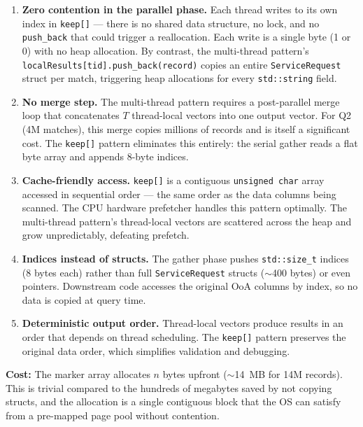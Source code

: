 \documentclass[12pt]{article}
\begin{document}
\begin{enumerate}
  \item \textbf{Zero contention in the parallel phase.}
    Each thread writes to its own index in \texttt{keep[]} --- there is no
    shared data structure, no lock, and no \texttt{push\_back} that could
    trigger a reallocation. Each write is a single byte (1 or 0) with no
    heap allocation. By contrast, the multi-thread pattern's
    \texttt{localResults[tid].push\_back(record)} copies an entire
    \texttt{ServiceRequest} struct per match, triggering heap allocations
    for every \texttt{std::string} field.

  \item \textbf{No merge step.}
    The multi-thread pattern requires a post-parallel merge loop that
    concatenates $T$ thread-local vectors into one output vector. For Q2
    (4M matches), this merge copies millions of records and is itself a
    significant cost. The \texttt{keep[]} pattern eliminates this entirely:
    the serial gather reads a flat byte array and appends 8-byte indices.

  \item \textbf{Cache-friendly access.}
    \texttt{keep[]} is a contiguous \texttt{unsigned char} array accessed in
    sequential order --- the same order as the data columns being scanned.
    The CPU hardware prefetcher handles this pattern optimally. The
    multi-thread pattern's thread-local vectors are scattered across the heap
    and grow unpredictably, defeating prefetch.

  \item \textbf{Indices instead of structs.}
    The gather phase pushes \texttt{std::size\_t} indices (8 bytes each)
    rather than full \texttt{ServiceRequest} structs ($\sim$400 bytes) or
    even pointers. Downstream code accesses the original OoA columns by
    index, so no data is copied at query time.

  \item \textbf{Deterministic output order.}
    Thread-local vectors produce results in an order that depends on thread
    scheduling. The \texttt{keep[]} pattern preserves the original data order,
    which simplifies validation and debugging.
\end{enumerate}

\noindent\textbf{Cost:}
The marker array allocates $n$ bytes upfront ($\sim$14~MB for 14M records).
This is trivial compared to the hundreds of megabytes saved by not copying
structs, and the allocation is a single contiguous block that the OS can
satisfy from a pre-mapped page pool without contention.
\end{document}
